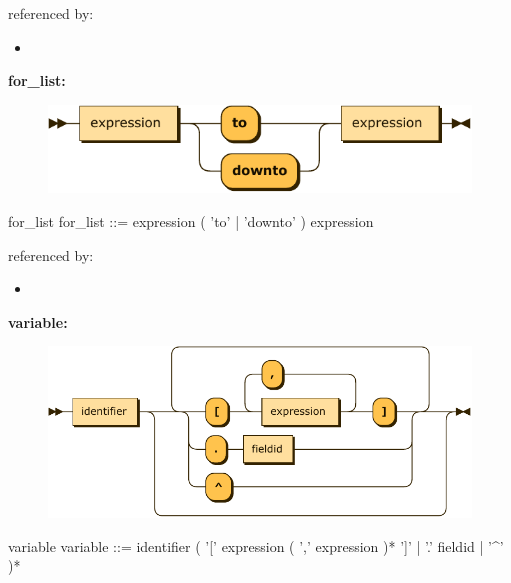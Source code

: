 \documentclass[10pt,a4paper,twoside]{article}
\providecommand{\tightlist}{%
  \setlength{\itemsep}{0pt}\setlength{\parskip}{0pt}}
\newcounter{grammarbox}[section]
\begin{document}
referenced by:

\begin{itemize}
\tightlist
\item
\end{itemize}

\textbf{for\_list:}

\begin{figure}[H]
\centering
\includegraphics{diagram/for_list.pdf}

\end{figure}

\begin{grammarbox}{for\_list}
\vspace{0.5em}
for\_list ::= expression ( 'to' | 'downto' ) expression
\end{grammarbox}

referenced by:

\begin{itemize}
\tightlist
\item
\end{itemize}

\textbf{variable:}

\begin{figure}[H]
\centering
\includegraphics{diagram/variable.pdf}

\end{figure}

\begin{grammarbox}{variable}
\vspace{0.5em}
variable ::= identifier ( '[' expression ( ',' expression )* ']' | '.' fieldid | '\^{}' )*
\end{grammarbox}
\end{document}
